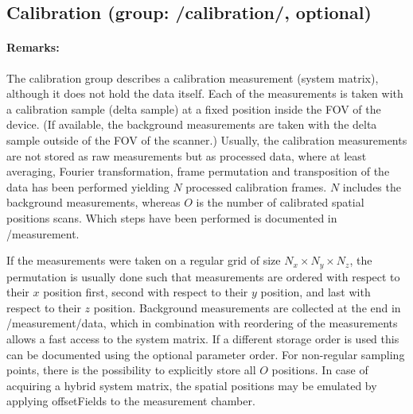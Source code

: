 \documentclass[landscape,a4paper]{article} %
\newcommand{\inlvar}[1]{{\ttfamily#1}}
\begin{document}
\newpage
\subsection{Calibration (group: \inlvar{/calibration/}, optional)}

\begin{multicols}{2}
\paragraph{Remarks:}
The calibration group describes a calibration measurement (system matrix), although it does not hold the data itself. Each of the measurements is taken with a calibration sample (delta sample) at a fixed position inside the FOV of the device. (If available, the background measurements are taken with the delta sample outside of the FOV of the scanner.) Usually, the calibration measurements are not stored as raw measurements but as processed data, where at least averaging, Fourier transformation, frame permutation and transposition of the data has been performed yielding $N$ processed calibration frames. $N$ includes the background measurements, whereas $O$ is the number of calibrated spatial positions scans. Which steps have been performed is documented in \inlvar{/measurement}.

If the measurements were taken on a regular grid of size $N_x \times N_y \times N_z$, the permutation is usually done such that measurements are ordered with respect to their $x$ position first, second with respect to their $y$ position, and last with respect to their $z$ position. Background measurements are collected at the end in \inlvar{/measurement/data}, which in combination with reordering of the measurements allows a fast access to the system matrix. If a different storage order is used this can be documented using the optional parameter \inlvar{order}. For non-regular sampling points, there is the possibility to explicitly store all $O$ positions. In case of acquiring a hybrid system matrix, the spatial positions may be emulated by applying \inlvar{offsetFields} to the measurement chamber.
\end{multicols}
\end{document}
